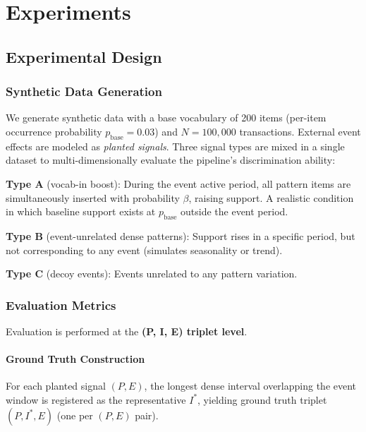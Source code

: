 \section{Experiments}\label{sec:experiments}

\subsection{Experimental Design}

\subsubsection{Synthetic Data Generation}

We generate synthetic data with a base vocabulary of 200 items
(per-item occurrence probability $p_{\text{base}} = 0.03$)
and $N = 100{,}000$ transactions.
External event effects are modeled as \emph{planted signals}.
Three signal types are mixed in a single dataset to
multi-dimensionally evaluate the pipeline's discrimination ability:

\noindent\textbf{Type A} (vocab-in boost):
During the event active period, all pattern items are simultaneously inserted
with probability $\beta$, raising support.
A realistic condition in which baseline support exists at $p_{\text{base}}$ outside the event period.

\noindent\textbf{Type B} (event-unrelated dense patterns):
Support rises in a specific period, but not corresponding to any event
(simulates seasonality or trend).

\noindent\textbf{Type C} (decoy events):
Events unrelated to any pattern variation.

\subsubsection{Evaluation Metrics}\label{sec:eval_metrics}

Evaluation is performed at the \textbf{(P, I, E) triplet level}.

\paragraph{Ground Truth Construction}
For each planted signal $(P, E)$, the longest dense interval overlapping
the event window is registered as the representative $I^*$,
yielding ground truth triplet $(P, I^*, E)$ (one per $(P, E)$ pair).

